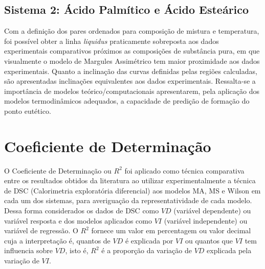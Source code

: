 

\subsection{Sistema 2: Ácido Palmítico e Ácido Esteárico}\label{sistema3}



Com a definição dos pares ordenados para composição de mistura e temperatura,  foi possível obter a linha \textit{liquidus} praticamente sobreposta aos dados experimentais comparativos próximos as composições de substância pura, em que visualmente o modelo de Margules Assimétrico tem maior proximidade aos dados experimentais. Quanto a inclinação das curvas definidas pelas regiões calculadas, são apresentadas inclinações equivalentes aos dados experimentais.  Ressalta-se a importância de modelos teórico/computacionais apresentarem, pela aplicação dos modelos termodinâmicos adequados, a capacidade de predição de formação do ponto eutético.




\section{Coeficiente de Determinação}

O Coeficiente de Determinação ou $R^2$ foi aplicado como técnica comparativa entre os resultados obtidos da literatura ao utilizar experimentalmente a técnica de DSC (Calorimetria exploratória diferencial) aos modelos MA, MS e Wilson em cada um dos sistemas, para averiguação da representatividade de cada modelo. Dessa forma considerados os dados de DSC como $VD$ (variável dependente) ou variável resposta e dos modelos aplicados como $VI$ (variável independente) ou variável de regressão. O $R^2$ fornece um valor em percentagem ou valor decimal cuja a interpretação é, quantos de $VD$ é explicada por $VI$ ou quantos que $VI$ tem influencia sobre $VD$, isto é, $R^2$ é a proporção da variação de $VD$ explicada pela variação de $VI$. 

